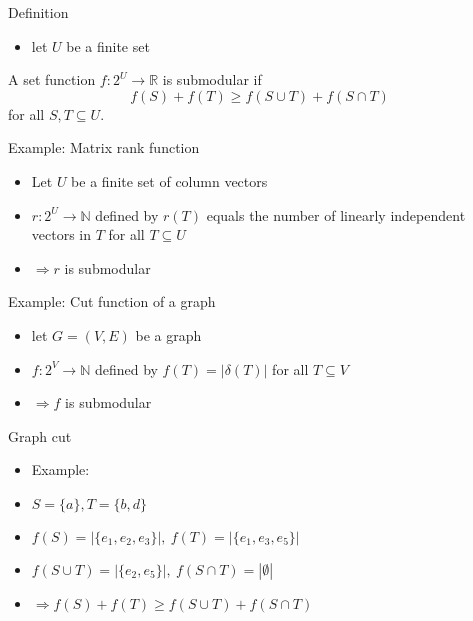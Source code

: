 \documentclass[usenames,dvipsnames]{beamer}
\newcommand{\R}{\mathbb{R}}
\newcommand{\N}{\mathbb{N}}
\begin{document}
\begin{frame}{Definition}
  \begin{itemize}
  \item  let $U$ be a finite set 
  \end{itemize}
  \begin{definition}
    A set function $f : 2^U \rightarrow \R$ is submodular if \[f(S) +
    f(T) \geq f(S \cup T) + f(S \cap T)\] for all $S,T \subseteq U$.
  \end{definition}
  
\end{frame}

\begin{frame}{Example: Matrix rank function}
  \begin{itemize}
    \item Let $U$ be a finite set of column vectors 
    \item $r : 2^U \rightarrow \N$ defined by $r(T)$ equals the number
      of linearly independent vectors in $T$ for all $T \subseteq U$
    \item $\Rightarrow r$ is submodular
  \end{itemize}
\end{frame}

\begin{frame}{Example: Cut function of a graph}
  \begin{itemize}
  \item let $G = (V,E)$ be a graph
  \item $f: 2^V \rightarrow \N$ defined by $f(T) = |\delta(T)|$ for
    all $T \subseteq V$ 
  \item $\Rightarrow f$ is submodular
  \end{itemize}
\end{frame}

  \begin{frame}{Graph cut}
    \begin{center}
    \end{center}
    \begin{itemize}
    \item[] Example: 
    \item $S = \{a\}, T = \{b,d\}$
    \item $f(S) = |\{e_1, e_2, e_3\}|,~f(T) = |\{e_1, e_3, e_5\}|$
    \item $f(S \cup T) = |\{e_2, e_5\}|,~f(S \cap T) = |\emptyset|$
    \item $\Rightarrow f(S) + f(T) \geq f(S \cup T) + f(S \cap T)$
    \end{itemize}
\end{frame}
\end{document}
